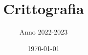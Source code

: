 \documentclass[
	a4paper, %
	fontsize=10pt, %
	twoside=true, %
	numbers=noenddot, %
]{kaobook}
\begin{document}


\title[{\normalfont\texttt{kaobook}} class]{Crittografia}
\subtitle{Anno 2022-2023}


\date{\today}


\frontmatter %





\dedication{
	I procioni sono meglio dei panda rossi.\\
}



\maketitle

\tableofcontents %
\end{document}
